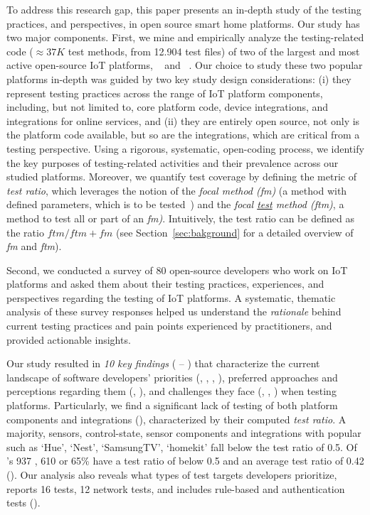 To address this research gap, this paper presents an in-depth study of the testing practices, and perspectives, in open source smart home platforms. Our study has two major components. First, we mine and empirically analyze the testing-related code ($\approx 37K$ test methods, from 12.904 test files) of two of the largest and most active open-source IoT platforms, \openhab~\cite{openhab} and \homeassistant~\cite{homeassistant}. Our choice to study these two popular platforms in-depth was guided by two key study design considerations: {\sf (i)} they represent testing practices across the range of IoT platform components, including, but not limited to, core platform code, device integrations, and integrations for online services, and {\sf (ii)} they are entirely open source, \ie not only is the platform code available, but so are the integrations, which are critical from a testing perspective. Using a rigorous, systematic, open-coding process, we identify the key purposes of testing-related activities and their prevalence across our studied platforms. Moreover, we quantify test coverage by defining the metric of {\em test ratio}, which leverages the notion of the {\em focal method (fm)} (\ie a method with defined parameters, which is to be tested~\cite{tufano_methods2test_2022}) and the {\em focal \underline{test} method (ftm)}, \ie a method to test all or part of an {\em fm)}. Intuitively, the test ratio can be defined as the ratio $ftm/ftm+fm$ (see Section~\ref{sec:bakground} for a detailed overview of {\em fm} and {\em ftm}).

Second, we conducted a survey of 80 open-source developers who work on IoT platforms and asked them about their testing practices, experiences, and perspectives regarding the testing of IoT platforms. 
A systematic, thematic analysis of these survey responses helped us understand the {\em rationale} behind current testing practices and pain points experienced by practitioners, and provided actionable insights.

Our study resulted in \textit{10 key findings} ( -- ) that characterize the current landscape of software developers' priorities (, , , ), preferred approaches and perceptions regarding them (, ), and challenges they face (, , ) when testing \iot platforms. Particularly, we find a significant lack of testing of both platform components and integrations (), characterized by their computed {\em test ratio}.  
A majority, \ie sensors, control-state, sensor components and integrations with popular \addons such as `Hue', `Nest'\cite{nest}, `SamsungTV', `homekit' \addons fall below the test ratio of 0.5. 
Of \homeassistant's 937 \addons, 610 or 65\% have a test ratio of below 0.5 and an average test ratio of 0.42 (). Our analysis also reveals what types of test targets developers prioritize, \eg \openhab reports 16 \addons tests, 12 network tests, and includes rule-based and authentication tests (). 


